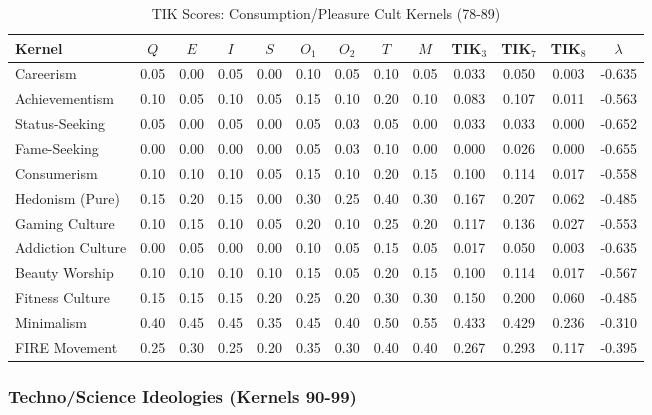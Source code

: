 \documentclass[11pt,a4paper]{article}
\theoremstyle{definition}
\theoremstyle{remark}
\begin{document}
\begin{table}[H]
\centering
\caption{TIK Scores: Consumption/Pleasure Cult Kernels (78-89)}
\label{tab:tik-consumption}
\small
\begin{tabular}{@{}l|ccccccc|c|cccc@{}}
\toprule
\textbf{Kernel} & $Q$ & $E$ & $I$ & $S$ & $O_1$ & $O_2$ & $T$ & $M$ & \textbf{TIK$_3$} & \textbf{TIK$_7$} & \textbf{TIK$_8$} & $\lambda$ \\
\midrule
Careerism & 0.05 & 0.00 & 0.05 & 0.00 & 0.10 & 0.05 & 0.10 & 0.05 & 0.033 & 0.050 & 0.003 & -0.635 \\
Achievementism & 0.10 & 0.05 & 0.10 & 0.05 & 0.15 & 0.10 & 0.20 & 0.10 & 0.083 & 0.107 & 0.011 & -0.563 \\
Status-Seeking & 0.05 & 0.00 & 0.05 & 0.00 & 0.05 & 0.03 & 0.05 & 0.00 & 0.033 & 0.033 & 0.000 & -0.652 \\
Fame-Seeking & 0.00 & 0.00 & 0.00 & 0.00 & 0.05 & 0.03 & 0.10 & 0.00 & 0.000 & 0.026 & 0.000 & -0.655 \\
Consumerism & 0.10 & 0.10 & 0.10 & 0.05 & 0.15 & 0.10 & 0.20 & 0.15 & 0.100 & 0.114 & 0.017 & -0.558 \\
Hedonism (Pure) & 0.15 & 0.20 & 0.15 & 0.00 & 0.30 & 0.25 & 0.40 & 0.30 & 0.167 & 0.207 & 0.062 & -0.485 \\
Gaming Culture & 0.10 & 0.15 & 0.10 & 0.05 & 0.20 & 0.10 & 0.25 & 0.20 & 0.117 & 0.136 & 0.027 & -0.553 \\
Addiction Culture & 0.00 & 0.05 & 0.00 & 0.00 & 0.10 & 0.05 & 0.15 & 0.05 & 0.017 & 0.050 & 0.003 & -0.635 \\
Beauty Worship & 0.10 & 0.10 & 0.10 & 0.10 & 0.15 & 0.05 & 0.20 & 0.15 & 0.100 & 0.114 & 0.017 & -0.567 \\
Fitness Culture & 0.15 & 0.15 & 0.15 & 0.20 & 0.25 & 0.20 & 0.30 & 0.30 & 0.150 & 0.200 & 0.060 & -0.485 \\
Minimalism & 0.40 & 0.45 & 0.45 & 0.35 & 0.45 & 0.40 & 0.50 & 0.55 & 0.433 & 0.429 & 0.236 & -0.310 \\
FIRE Movement & 0.25 & 0.30 & 0.25 & 0.20 & 0.35 & 0.30 & 0.40 & 0.40 & 0.267 & 0.293 & 0.117 & -0.395 \\
\bottomrule
\end{tabular}
\end{table}

\subsubsection{Techno/Science Ideologies (Kernels 90-99)}
\end{document}
